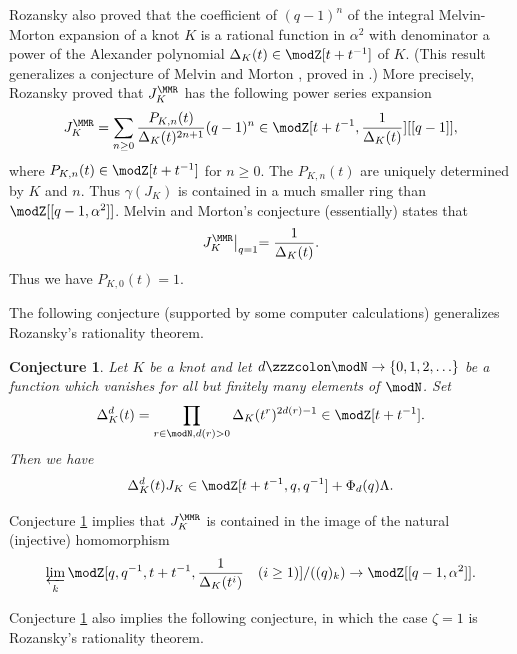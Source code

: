 \documentclass{amsart}
\numberwithin{equation}{section}
\numberwithin{figure}{section}
\theoremstyle{plain}
\newtheorem{conjecture}[theorem]{Conjecture}
\theoremstyle{definition}
\theoremstyle{remark}
\begin{document}
Rozansky \cite{Rozansky3} also proved that the coefficient of
$(q-1)^n$ of the integral Melvin-Morton expansion of a knot $K$ is a
rational function in $\alpha ^2$ with denominator a power of the Alexander
polynomial $\Delta _K(t)\in \modZ [t+t^{-1}]$ of $K$.  (This result generalizes a
conjecture of Melvin and Morton \cite{Melvin-Morton}, proved in
\cite{Bar-Natan-Garoufalidis}.)  More precisely, Rozansky proved that
$J^\MMR_K$ has the following power series expansion
\begin{equation*}
  J_K^\MMR = \sum_{n\ge 0}\frac{P_{K,n}(t)}{\Delta _K(t)^{2n+1}}(q-1)^n
  \in \modZ [t+t^{-1},\frac{1}{\Delta _K(t)}][[q-1]],
\end{equation*}
where $P_{K,n}(t)\in \modZ [t+t^{-1}]$ for $n\ge 0$.  The $P_{K,n}(t)$ are
uniquely determined by $K$ and $n$.  Thus $\gamma (J_K)$ is contained in a
much smaller ring than $\modZ [[q-1,\alpha ^2]]$.  Melvin and Morton's
conjecture (essentially) states that
\begin{equation*}
  J_K^\MMR\bigl|_{q=1}=\frac{1}{\Delta _K(t)}.
\end{equation*}
Thus we have $P_{K,0}(t)=1$.

The following conjecture (supported by some computer calculations)
generalizes Rozansky's rationality theorem.

\begin{conjecture}
  \label{r44}
  Let $K$ be a knot and let $d\zzzcolon \modN \rightarrow \{0,1,2,\ldots \}$ be a function which
  vanishes for all but finitely many elements of $\modN $.  Set
  \begin{equation*}
    \Delta ^d_K(t) = \prod_{r\in \modN ,d(r)>0}\Delta _K(t^r)^{2d(r)-1}\in \modZ [t+t^{-1}].
  \end{equation*}
  Then we have
  \begin{equation*}
    \Delta ^d_K(t)J_K \in \modZ [t+t^{-1},q,q^{-1}] + \Phi _d(q)\Lambda .
  \end{equation*}
\end{conjecture}

Conjecture \ref{r44} implies that $J_K^\MMR$ is contained in the image
of the natural (injective) homomorphism
  \begin{equation*}
    \varprojlim_k \modZ [q,q^{-1},t+t^{-1},\frac{1}{\Delta _K(t^i)}\quad  (i\ge 1)]/((q)_k)
    \rightarrow \modZ [[q-1,\alpha ^2]].
  \end{equation*}

Conjecture \ref{r44} also implies the following conjecture, in which
the case $\zeta =1$ is Rozansky's rationality theorem.
\end{document}

